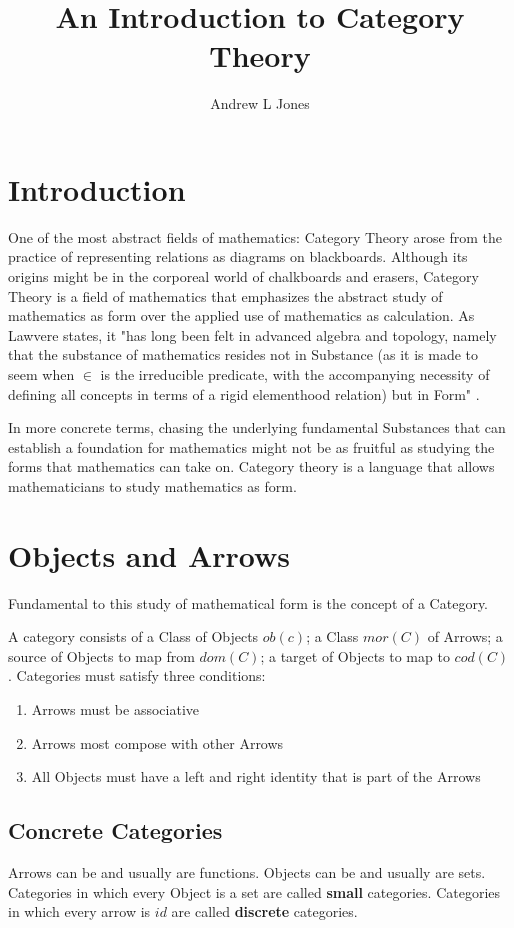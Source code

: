 \documentclass{article}
\title{An Introduction to Category Theory}
\author{Andrew L Jones}\date{}
\begin{document}
\maketitle


\section*{Introduction}
One of the most abstract fields of mathematics: Category Theory arose from the practice of representing relations as diagrams on blackboards. Although its origins might be in the corporeal world of chalkboards and erasers, Category Theory is a field of mathematics that emphasizes the abstract study of mathematics as form over the applied use of mathematics as calculation. As Lawvere states, it "has long been felt in advanced algebra and topology, namely that the substance of mathematics resides not in Substance (as it is made to seem when $\in$ is the irreducible predicate, with the accompanying necessity of defining all concepts in terms of a rigid elementhood relation) but in Form" \cite{Lawvere01}. 

In more concrete terms, chasing the underlying fundamental Substances that can establish a foundation for mathematics might not be as fruitful as studying the forms that mathematics can take on. Category theory is a language that allows mathematicians to study mathematics as form.


\section{Objects and Arrows}
Fundamental to this study of mathematical form is the concept of a Category.
\begin{definition}
A category consists of a Class of Objects $ob(c)$; a Class $mor(C)$ of Arrows; a source of Objects to map from $dom(C)$; a target of Objects to map to $cod(C)$. Categories must satisfy three conditions: \begin{enumerate}
    \item Arrows must be associative
    \item Arrows most compose with other Arrows
    \item All Objects must have a left and right identity that is part of the Arrows
  \end{enumerate}
\end{definition}
\subsection{Concrete Categories}
Arrows can be and usually are functions. Objects can be and usually are sets. Categories in which every Object is a set are called \textbf{small} categories. Categories in which every arrow is $id$ are called \textbf{discrete} categories.
\end{document}
